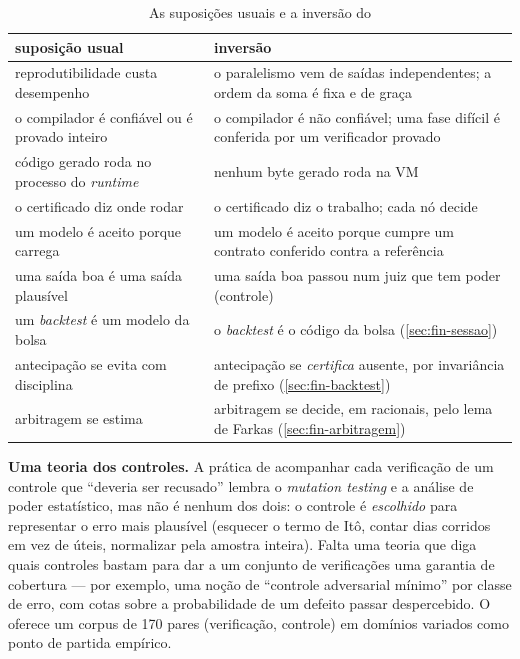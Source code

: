 \begin{table}[htbp]
\centering
\caption{As suposições usuais e a inversão do \vapor{}}\label{tab:inversoes}
\small
\begin{tabularx}{\textwidth}{@{}XX@{}}
\toprule
\textbf{suposição usual} & \textbf{inversão}\\
\midrule
reprodutibilidade custa desempenho & o paralelismo vem de saídas independentes; a ordem da soma é fixa e de graça\\
o compilador é confiável ou é provado inteiro & o compilador é não confiável; uma fase difícil é conferida por um verificador provado\\
código gerado roda no processo do \textit{runtime} & nenhum byte gerado roda na VM\\
o certificado diz onde rodar & o certificado diz o trabalho; cada nó decide\\
um modelo é aceito porque carrega & um modelo é aceito porque cumpre um contrato conferido contra a referência\\
uma saída boa é uma saída plausível & uma saída boa passou num juiz que tem poder (controle)\\
um \textit{backtest} é um modelo da bolsa & o \textit{backtest} é o código da bolsa (\autoref{sec:fin-sessao})\\
antecipação se evita com disciplina & antecipação se \emph{certifica} ausente, por invariância de prefixo (\autoref{sec:fin-backtest})\\
arbitragem se estima & arbitragem se decide, em racionais, pelo lema de Farkas (\autoref{sec:fin-arbitragem})\\
\bottomrule
\end{tabularx}
\end{table}

\begin{doutorado}
\textbf{Uma teoria dos controles.} A prática de acompanhar cada verificação de um controle que ``deveria ser recusado'' lembra o \textit{mutation testing} e a análise de poder estatístico, mas não é nenhum dos dois: o controle é \emph{escolhido} para representar o erro mais plausível (esquecer o termo de Itô, contar dias corridos em vez de úteis, normalizar pela amostra inteira). Falta uma teoria que diga quais controles bastam para dar a um conjunto de verificações uma garantia de cobertura --- por exemplo, uma noção de ``controle adversarial mínimo'' por classe de erro, com cotas sobre a probabilidade de um defeito passar despercebido. O \vapor{} oferece um corpus de 170 pares (verificação, controle) em domínios variados como ponto de partida empírico.
\end{doutorado}
